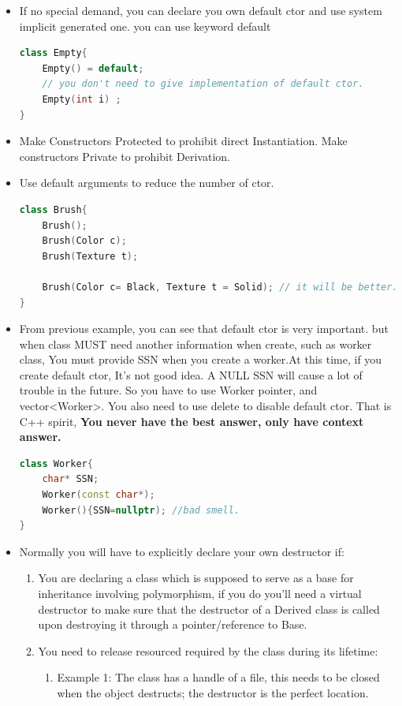 \documentclass[a4paper,11pt,twoside]{book}
\begin{document}
\begin{itemize}
	\item If no special demand, you can declare you own default ctor and use system implicit generated one. you can use keyword default
\begin{lstlisting}[frame=single, language=c++]
class Empty{
	Empty() = default;
	// you don't need to give implementation of default ctor.
	Empty(int i) ;
}
\end{lstlisting}
	
	
	\item Make Constructors Protected to prohibit direct Instantiation. Make constructors Private to prohibit Derivation.
	
	\item Use default arguments to reduce the number of ctor.
\begin{lstlisting}[frame=single, language=c++]
class Brush{
	Brush();
	Brush(Color c);
	Brush(Texture t);
	
	Brush(Color c= Black, Texture t = Solid); // it will be better.
}
	\end{lstlisting}
	
	
	\item From previous example, you can see that default ctor is very important. but when class MUST need another information when create, such as  worker class, You must provide SSN when you create a worker.At this time, if you create default ctor, It's not good idea. A NULL SSN will cause a lot of trouble in the future.  So you have to use Worker pointer, and vector<Worker>.  You also need to use delete to disable default ctor. That is C++ spirit, \textbf{You never have the best answer, only have context answer. }
\begin{lstlisting}[frame=single, language=c++]
class Worker{
	char* SSN;
	Worker(const char*);
	Worker(){SSN=nullptr); //bad smell.
}
	\end{lstlisting}
	
	\item Normally you will have to explicitly declare your own destructor if:
	\begin{enumerate}
		\item You are declaring a class which is supposed to serve as a base for inheritance involving polymorphism, if you do you'll need a virtual destructor to make sure that the destructor of a Derived class is called upon destroying it through a pointer/reference to Base.
		
		\item You need to release resourced required by the class during its lifetime:
		\begin{enumerate}
			\item Example 1: The class has a handle of a file, this needs to be closed when the object destructs; the destructor is the perfect location.
			

\end{enumerate}
\end{enumerate}
\end{itemize}
\end{document}
